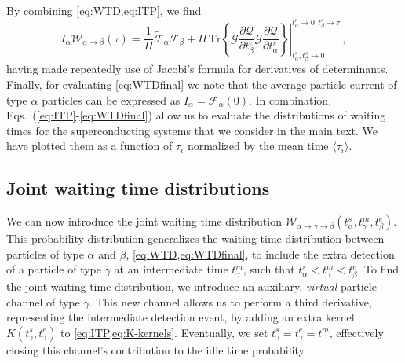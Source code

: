\documentclass[aps,prl,amsmath,twocolumn,floatfix,superscriptaddress,longbibliography,footinbib]{revtex4-1}
\begin{document}
By combining \cref{eq:WTD,eq:ITP}, we find
\begin{equation}
	I_{\alpha} \mathcal{W}_{{\alpha} \rightarrow {\beta}}(\tau)=\frac{1}{\Pi}\tilde{\mathcal{F}}_{\alpha}\mathcal{F}_{\beta}
	+ \left. \Pi \, \mathrm{Tr}\left\{ \mathcal{G} \frac{\partial \mathcal{Q}}{\partial t^{e}_{\beta}}\mathcal{G} \frac{\partial \mathcal{Q}}{\partial t^{s}_{\alpha}} \right\} \right|_{t^{s}_\alpha,t^s_\beta\rightarrow 0}^{t^e_\alpha\rightarrow 0, t^{e}_\beta\rightarrow \tau} \,,
	\label{eq:WTDfinal}
\end{equation}
having made repeatedly use of Jacobi's formula for derivatives of determinants. Finally, for evaluating \cref{eq:WTDfinal} we note that the average particle current of type $\alpha$ particles can be expressed as $I_\alpha\!=\!\mathcal{F}_{\alpha}(0)$. In combination, Eqs.~(\ref{eq:ITP}-\ref{eq:WTDfinal}) allow us to evaluate the distributions of waiting times for the superconducting systems that we consider in the main text. 
We have plotted them as a function of $\tau_i$ normalized by the mean time $\langle \tau_i \rangle$. 

\subsection{Joint waiting time distributions}

We can now introduce the joint waiting time distribution $\mathcal{W}_{\alpha \rightarrow \gamma \rightarrow \beta}(t^s_\alpha,t^m_\gamma,t^e_\beta)$. This probability distribution generalizes the waiting time distribution between particles of type $\alpha$ and $\beta$, \cref{eq:WTD,eq:WTDfinal}, to include the extra detection of a particle of type $\gamma$ at an intermediate time $t^m_\gamma$, such that $t^s_\alpha<t^m_\gamma<t^e_\beta$. 
To find the joint waiting time distribution, we introduce an auxiliary, \textit{virtual} particle channel of type $\gamma$. This new channel allows us to perform a third derivative, representing the intermediate detection event, by adding an extra kernel $K(t^s_\gamma,t^e_\gamma)$ to \cref{eq:ITP,eq:K-kernels}. Eventually, we set $t^s_\gamma=t^e_\gamma=t^m$, effectively closing this channel's contribution to the idle time probability. 
\end{document}
